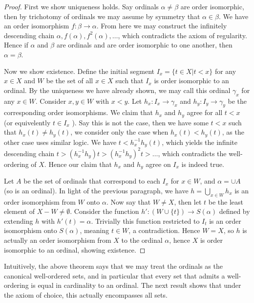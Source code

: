\documentclass[]{article}
\begin{document}
 \begin{proof}
		 First we show uniqueness holds. Say ordinals $\alpha \neq \beta$ are order isomorphic, then by trichotomy of ordinals we may assume by symmetry that $\alpha \in \beta$. We have an order isomorphism $f: \beta \to \alpha$. From here we may construct the infinitely descending chain $\alpha, f(\alpha), f^2(\alpha), \ldots$, which contradicts the axiom of regularity. Hence if $\alpha$ and $\beta$ are ordinals and are order isomorphic to one another, then $\alpha = \beta$.

		 Now we show existence. Define the initial segment $I_x = \{t \in X | t < x\}$ for any $x \in X$ and $W$ be the set of all $x \in X$ such that $I_x$ is order isomorphic to an ordinal. By the uniqueness we have already shown, we may call this ordinal $\gamma_x$ for any $x \in W$. Consider $x, y \in W$ with $x < y$. Let $h_x: I_x \to \gamma_x$ and $h_y: I_y \to \gamma_y$ be the corresponding order isomorphisms. We claim that $h_x$ and $h_y$ agree for all $t < x$ (or equivelently $t \in I_x$ ). Say this is not the case, then we have some $t < x$ such that $h_x(t) \neq h_y(t)$, we consider only the case when  $h_x(t) < h_y(t)$, as the other case uses similar logic. We have $t < h_x^{-1}h_y(t)$, which yields the infinite descending chain $t > (h_x^{-1}h_y)t > (h_x^{-1}h_y)^2t > \ldots$, which contradicts the well-ordering of $X$. Hence our claim that $h_x$ and $h_y$ agree on $I_x$ is indeed true.
		 
		 Let $A$ be the set of ordinals that correspond to each $I_x$ for $x \in W$, and $\alpha = \cup A$ (so \alpha is an ordinal). In light of the previous paragraph, we have $h = \bigcup_{x \in W} h_x$ is an order isomorphism from $W$ onto $\alpha$. Now say that $W \neq X$, then let $t$ be the least element of $X - W \neq \emptyset$. Consider the function $h': (W \cup \{t\}) \to S(\alpha)$ defined by extending $h$ with $h'(t) = \alpha$.  Trivially this function restricted to $I_t$ is an order isomorphism onto $S(\alpha)$, meaning $t \in W$, a contradiction. Hence $W = X$, so $h$ is actually an order isomorphism from $X$ to the ordinal $\alpha$, hence $X$ is order isomorphic to an ordinal, showing existence.
 \end{proof}

 Intuitively, the above theorem says that we may treat the ordinals as the canonical well-ordered sets, and in particular that every set that admits a well-ordering is equal in cardinality to an ordinal. The next result shows that under the axiom of choice, this actually encompasses all sets.
\end{document}
